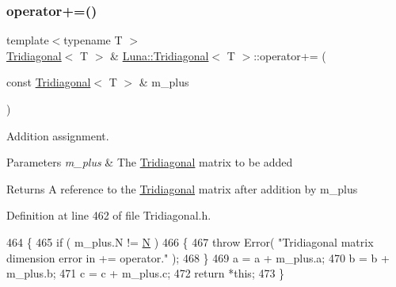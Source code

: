 \subsubsection{\texorpdfstring{operator+=()}{operator+=()}\hspace{0.1cm}{\footnotesize\ttfamily [1/2]}}
{\footnotesize\ttfamily template$<$typename T $>$ \\
\hyperlink{classLuna_1_1Tridiagonal}{Tridiagonal}$<$ T $>$ \& \hyperlink{classLuna_1_1Tridiagonal}{Luna\+::\+Tridiagonal}$<$ T $>$\+::operator+= (\begin{DoxyParamCaption}\item[{const \hyperlink{classLuna_1_1Tridiagonal}{Tridiagonal}$<$ T $>$ \&}]{m\+\_\+plus }\end{DoxyParamCaption})\hspace{0.3cm}{\ttfamily [inline]}}



Addition assignment. 


\begin{DoxyParams}{Parameters}
{\em m\+\_\+plus} & The \hyperlink{classLuna_1_1Tridiagonal}{Tridiagonal} matrix to be added \\
\hline
\end{DoxyParams}
\begin{DoxyReturn}{Returns}
A reference to the \hyperlink{classLuna_1_1Tridiagonal}{Tridiagonal} matrix after addition by m\+\_\+plus 
\end{DoxyReturn}


Definition at line 462 of file Tridiagonal.\+h.


\begin{DoxyCode}
464   \{
465     \textcolor{keywordflow}{if} ( m\_plus.N != \hyperlink{namespaceHeat__plot_a7d050092798e28458a263710837bda77}{N} )
466     \{
467       \textcolor{keywordflow}{throw} Error( \textcolor{stringliteral}{"Tridiagonal matrix dimension error in += operator."} );
468     \}
469     a = a + m\_plus.a;
470     b = b + m\_plus.b;
471     c = c + m\_plus.c;
472     \textcolor{keywordflow}{return} *\textcolor{keyword}{this};
473   \}
\end{DoxyCode}
\mbox{\label{classLuna_1_1Tridiagonal_aed6025d2b9420b4eb7488c2a644c1110}} 
